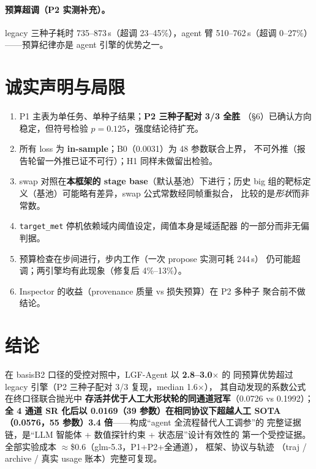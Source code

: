 \documentclass[11pt,a4paper]{ctexart}
\begin{document}
\paragraph{预算超调（P2 实测补充）。}legacy 三种子耗时
735--873\,s（超调 23--45\%），agent 臂 510--762\,s（超调 0--27\%）
——预算纪律亦是 agent 引擎的优势之一。

\section{诚实声明与局限}

\begin{enumerate}\itemsep2pt
  \item P1 主表为单任务、单种子结果；\textbf{P2 三种子配对 3/3 全胜}
        （\S 6）已确认方向稳定，但符号检验 $p=0.125$，强度结论待扩充。
  \item 所有 loss 为 \textbf{in-sample}；B0（0.0031）为 48 参数联合上界，
        不可外推（报告轮留一外推已证不可行）；H1 同样未做留出检验。
  \item swap 对照在\textbf{本框架的 stage base}（默认基池）下进行；历史
        big 组的靶标定义（基池）可能略有差异，swap 公式常数经同帧重拟合，
        比较的是\emph{形状}而非常数。
  \item \texttt{target\_met} 停机依赖域内阈值设定，阈值本身是域适配器
        的一部分而非无偏判据。
  \item 预算检查在步间进行，步内工作（一次 propose 实测可耗 244\,s）
        仍可能超调；两引擎均有此现象（修复后 4\%--13\%）。
  \item Inspector 的收益（provenance 质量 vs 损失预算）在 P2 多种子
        聚合前不做结论。
\end{enumerate}

\section{结论}

在 basisB2 口径的受控对照中，LGF-Agent 以 \textbf{2.8--3.0$\times$} 的
同预算优势超过 legacy 引擎（P2 三种子配对 3/3 复现，median 1.6$\times$），
其自动发现的系数公式在终口径联合抛光中
\textbf{存活并优于人工大形状轮的同通道冠军}（0.0726 vs 0.1992）；
\textbf{全 4 通道 SR 化后以 0.0169（39 参数）在相同协议下超越人工
SOTA（0.0576，55 参数）3.4 倍}——构成``agent 全流程替代人工调参''的
完整证据链，是``LLM 智能体 + 数值探针约束 + 状态层''设计有效性的
第一个受控证据。全部实验成本 $\approx$\$0.6（glm-5.3，P1+P2+全通道），
框架、协议与轨迹
（traj / archive / 真实 usage 账本）完整可复现。
\end{document}
